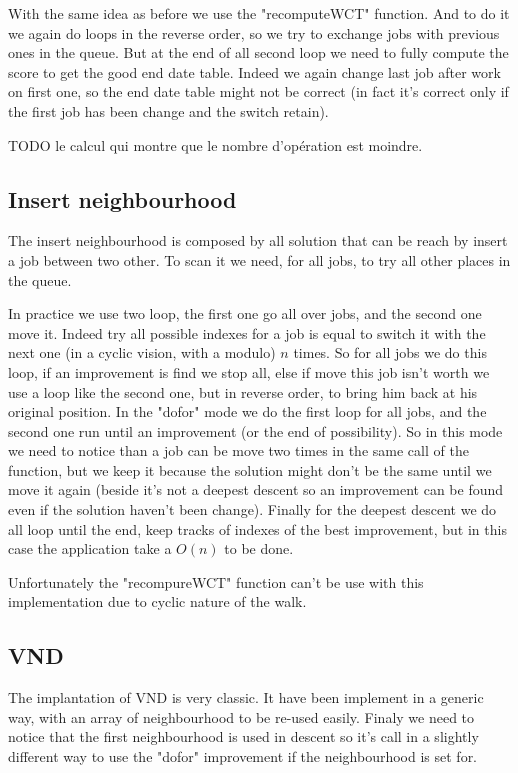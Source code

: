 \documentclass[12pt,a4paper]{article}
\begin{document}
With the same idea as before we use the "recomputeWCT" function. And to do it we again do loops in the reverse order, so we try to exchange jobs with previous ones in the queue. But at the end of all second loop we need to fully compute the score to get the good end date table. Indeed we again change last job after work on first one, so the end date table might not be correct (in fact it's correct only if the first job has been change and the switch retain).

TODO le calcul qui montre que le nombre d'opération est moindre.

\subsection{Insert neighbourhood}

The insert neighbourhood is composed by all solution that can be reach by insert a job between two other. To scan it we need, for all jobs, to try all other places in the queue.

In practice we use two loop, the first one go all over jobs, and the second one move it. Indeed try all possible indexes for a job is equal to switch it with the next one (in a cyclic vision, with a modulo) $n$ times. So for all jobs we do this loop, if an improvement is find we stop all, else if move this job isn't worth we use a loop like the second one, but in reverse order, to bring him back at his original position. In the "dofor" mode we do the first loop for all jobs, and the second one run until an improvement (or the end of possibility). So in this mode we need to notice than a job can be move two times in the same call of the function, but we keep it because the solution might don't be the same until we move it again (beside it's not a deepest descent so an improvement can be found even if the solution haven't been change). Finally for the deepest descent we do all loop until the end, keep tracks of indexes of the best improvement, but in this case the application take a $O(n)$ to be done.

Unfortunately the "recompureWCT" function can't be use with this implementation due to cyclic nature of the walk.

\subsection{VND}

The implantation of VND is very classic. It have been implement in a generic way, with an array of neighbourhood to be re-used easily. Finaly we need to notice that the first neighbourhood is used in descent so it's call in a slightly different way to use the "dofor" improvement if the neighbourhood is set for.
\end{document}
